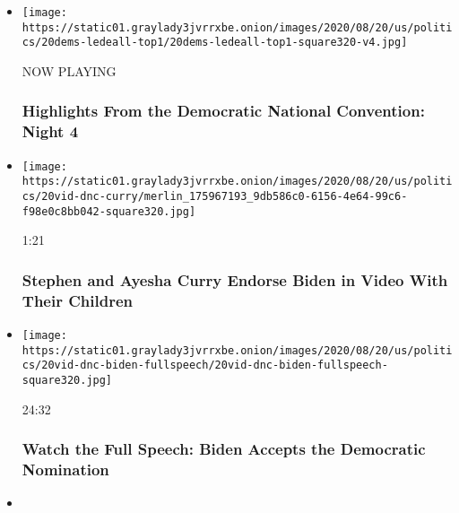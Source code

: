 \begin{itemize}
\item
  \texttt{[image: https://static01.graylady3jvrrxbe.onion/images/2020/08/20/us/politics/20dems-ledeall-top1/20dems-ledeall-top1-square320-v4.jpg]}

  NOW PLAYING

  \hypertarget{highlights-from-the-democratic-national-convention-night-4-2}{%
  \subsubsection{Highlights From the Democratic National Convention:
  Night
  4}\label{highlights-from-the-democratic-national-convention-night-4-2}}
\item
  \href{https://www.nytimes3xbfgragh.onion/video/us/elections/100000007299782/stephen-curry-speaks-dnc.html?action=click\&module=video-series-bar\&region=header\&pgtype=Article\&playlistId=video/2020-Elections}{}

  \texttt{[image: https://static01.graylady3jvrrxbe.onion/images/2020/08/20/us/politics/20vid-dnc-curry/merlin\_175967193\_9db586c0-6156-4e64-99c6-f98e0c8bb042-square320.jpg]}

  1:21

  \hypertarget{stephen-and-ayesha-curry-endorse-biden-in-video-with-their-children}{%
  \subsubsection{Stephen and Ayesha Curry Endorse Biden in Video With
  Their
  Children}\label{stephen-and-ayesha-curry-endorse-biden-in-video-with-their-children}}
\item
  \href{https://www.nytimes3xbfgragh.onion/video/us/elections/100000007299879/joe-biden-full-speech.html?action=click\&module=video-series-bar\&region=header\&pgtype=Article\&playlistId=video/2020-Elections}{}

  \texttt{[image: https://static01.graylady3jvrrxbe.onion/images/2020/08/20/us/politics/20vid-dnc-biden-fullspeech/20vid-dnc-biden-fullspeech-square320.jpg]}

  24:32

  \hypertarget{watch-the-full-speech-biden-accepts-the-democratic-nomination}{%
  \subsubsection{Watch the Full Speech: Biden Accepts the Democratic
  Nomination}\label{watch-the-full-speech-biden-accepts-the-democratic-nomination}}
\item
  \href{https://www.nytimes3xbfgragh.onion/video/us/elections/100000007299747/michael-bloomberg-speaks-dnc.html?action=click\&module=video-series-bar\&region=header\&pgtype=Article\&playlistId=video/2020-Elections}{}


\end{itemize}
